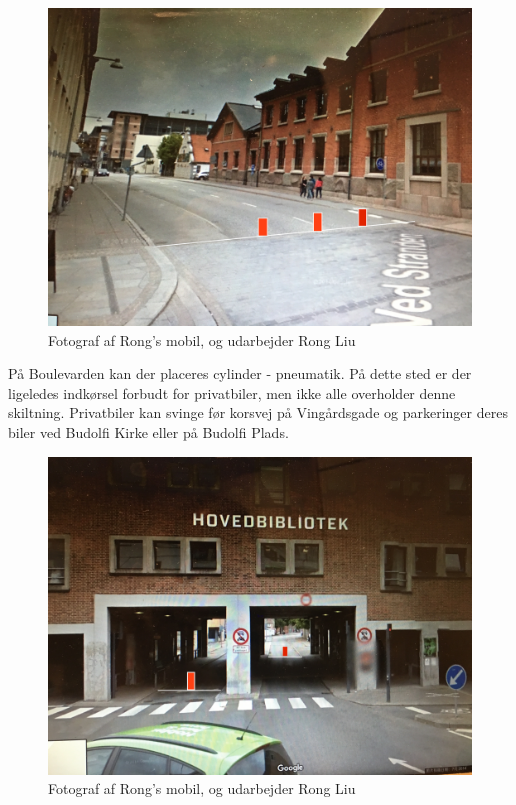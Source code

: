 \begin{figure}[htbp]
  \centering
  \begin{adjustbox}{max width=\textwidth}
    \includegraphics{figures/Billederogfigur/3.jpg}
 \end{adjustbox}
  \caption{ Fotograf af Rong’s mobil, og udarbejder Rong Liu}
   \label{fig: Fotograf af Rong}
\end{figure}
                                                   

På Boulevarden kan der placeres cylinder - pneumatik. På dette sted er der ligeledes indkørsel forbudt for privatbiler, men ikke alle overholder denne skiltning. Privatbiler kan svinge før korsvej på Vingårdsgade og parkeringer deres biler ved Budolfi Kirke eller på Budolfi Plads. 
                                                
\begin{figure}[htbp]
  \centering
  \begin{adjustbox}{max width=\textwidth}
    \includegraphics{figures/Billederogfigur/4.jpg}
 \end{adjustbox}
  \caption{ Fotograf af Rong’s mobil, og udarbejder Rong Liu}
   \label{fig: Fotograf af Rong}
\end{figure}

